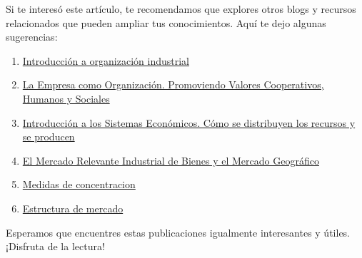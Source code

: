 \documentclass[
  a4paper,
]{article}
\theoremstyle{definition}
\theoremstyle{remark}
\begin{document}
Si te interesó este artículo, te recomendamos que explores otros blogs y
recursos relacionados que pueden ampliar tus conocimientos. Aquí te dejo
algunas sugerencias:

\begin{enumerate}
\def\labelenumi{\arabic{enumi}.}
\item
  \href{../2023-06-12-introducion-organizacion-industrial-oi-cap1/index.qmd}{Introducción
  a organización industrial}
\item
  \href{../2023-06-13-empresa-como-organizacion-oi-cap1/index.qmd}{La
  Empresa como Organización. Promoviendo Valores Cooperativos, Humanos y
  Sociales}
\item
  \href{../2023-06-13-sistemas-economicos-oi.cap1/index.qmd}{Introducción
  a los Sistemas Económicos. Cómo se distribuyen los recursos y se
  producen}
\item
  \href{../2023-06-15-mercado-relevante-oi-cap2/index.qmd}{El Mercado
  Relevante Industrial de Bienes y el Mercado Geográfico}
\item
  \href{../2023-06-16-concentracion-poder-oi-cap3/index.qmd}{Medidas de
  concentracion}
\item
  \href{../2023-06-17-estructura-mercado-oi-cap4/index.qmd}{Estructura
  de mercado}
\end{enumerate}

Esperamos que encuentres estas publicaciones igualmente interesantes y
útiles. ¡Disfruta de la lectura!


\printbibliography
\end{document}
